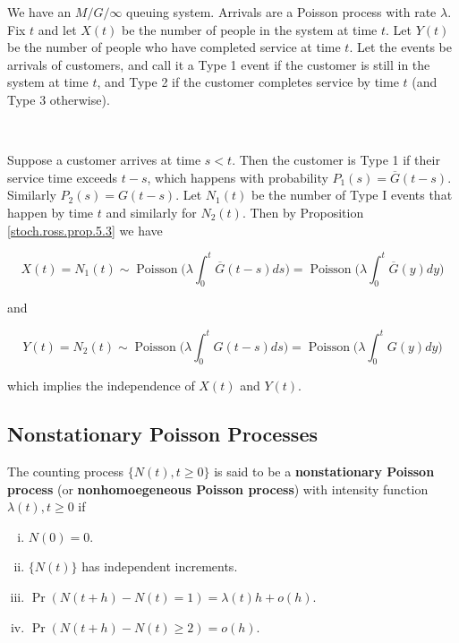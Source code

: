\begin{example}  We have an \(M/G/\infty\) queuing system. Arrivals are a Poisson process with rate \(\lambda\). Fix \(t\) and let \(X(t)\) be the number of people in the system at time \(t\). Let \(Y(t)\) be the number of people who have completed service at time \(t\). Let the events be arrivals of customers, and call it a Type 1 event if the customer is still in the system at time \(t\), and Type 2 if the customer completes service by time \(t\) (and Type 3 otherwise).

\

Suppose a customer arrives at time \(s < t\). Then the customer is Type 1 if their service time exceeds \(t-s\), which happens with probability \(P_1(s) = \overline{G}(t-s)\). Similarly \(P_2(s) = G(t-s)\). Let \(N_1(t)\) be the number of Type I events that happen by time \(t\) and similarly for \(N_2(t)\). Then by Proposition \ref{stoch.ross.prop.5.3} we have

\[
X(t) =N_1(t) \sim \operatorname{Poisson} \bigg( \lambda \int_0^t \overline{G}(t-s) ds \bigg) =  \operatorname{Poisson} \bigg( \lambda \int_0^t \overline{G}(y) dy \bigg)
\]

and

\[
Y(t) = N_2(t) \sim  \operatorname{Poisson} \bigg( \lambda \int_0^t G(t-s) ds \bigg) =  \operatorname{Poisson} \bigg( \lambda \int_0^t G(y) dy \bigg)
\]

which implies the independence of \(X(t)\) and \(Y(t)\).
\end{example}

\subsection{Nonstationary Poisson Processes}

\begin{definition}\label{stoch.nonstat.pois.proc.def.ross} The counting process \(\{N(t), t \geq 0\}\) is said to be a \textbf{nonstationary Poisson process} (or \textbf{nonhomoegeneous Poisson process}) with intensity function \(\lambda(t), t \geq 0\) if

\begin{enumerate}[(i)]

\item \(N(0)= 0\).

\item \(\{N(t)\}\) has independent increments.

\item \(\Pr(N(t+h) -N(t) = 1) = \lambda(t) h + o(h) \).

\item \(\Pr(N(t+h) -N(t) \geq 2) =  o(h) \).

\end{enumerate}

\end{definition}

